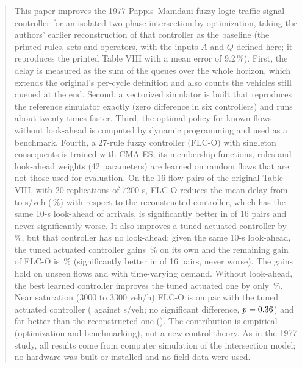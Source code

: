 \documentclass[journal]{IEEEtran}
\begin{document}
\begin{abstract}
This paper improves the 1977 Pappis--Mamdani fuzzy-logic traffic-signal controller for an isolated two-phase intersection by optimization, taking the authors' earlier reconstruction of that controller as the baseline (the printed rules, sets and operators, with the inputs $A$ and $Q$ defined here; it reproduces the printed Table VIII with a mean error of 9.2\,\%). First, the delay is measured as the sum of the queues over the whole horizon, which extends the original's per-cycle definition and also counts the vehicles still queued at the end. Second, a vectorized simulator is built that reproduces the reference simulator exactly (zero difference in six controllers) and runs about twenty times faster. Third, the optimal policy for known flows without look-ahead is computed by dynamic programming and used as a benchmark. Fourth, a 27-rule fuzzy controller (FLC-O) with singleton consequents is trained with CMA-ES; its membership functions, rules and look-ahead weights (42 parameters) are learned on random flows that are not those used for evaluation. On the 16 flow pairs of the original Table VIII, with 20 replications of 7200 s, FLC-O reduces the mean delay from \DelayOfPap{} to \DelayOfFlc{} s/veh (\RedFlc\,\%) with respect to the reconstructed controller, which has the same 10-s look-ahead of arrivals, is significantly better in \ParMejorPap{} of 16 pairs and never significantly worse. It also improves a tuned actuated controller by \RedActAfOf\,\%, but that controller has no look-ahead: given the same 10-s look-ahead, the tuned actuated controller gains \RedVistaAfOf\,\% on its own and the remaining gain of FLC-O is \RedActVOf\,\% (significantly better in \ParMejorActV{} of 16 pairs, never worse). The gains hold on unseen flows and with time-varying demand. Without look-ahead, the best learned controller improves the tuned actuated one by only \RedActMlpC\,\%. Near saturation (3000 to 3300 veh/h) FLC-O is on par with the tuned actuated controller (\DelaySaFlc{} against \DelaySaActAf{} s/veh; no significant difference, $p=\EscActAfSaP$) and far better than the reconstructed one (\DelaySaPap{}). The contribution is empirical (optimization and benchmarking), not a new control theory. As in the 1977 study, all results come from computer simulation of the intersection model; no hardware was built or installed and no field data were used.
\end{abstract}
\end{document}
